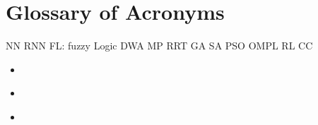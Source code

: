 \chapter*{Glossary of Acronyms}

NN
RNN
FL: fuzzy Logic
DWA
MP
RRT
GA
SA
PSO
OMPL
RL
CC
\begin{itemize}
    \item \textbf{} 
    \item \textbf{} 

    \newpage
    \thispagestyle{acronyms}
    \item \textbf{} 

\end{itemize}

\newpage







